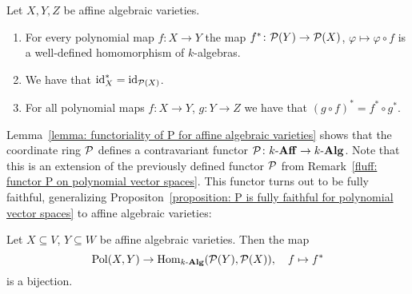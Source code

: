\begin{lemma}
  \label{lemma: functoriality of P for affine algebraic varieties}
  Let $X, Y, Z$ be affine algebraic varieties.
  \begin{enumerate}
    \item
      For every polynomial map $f \colon X \to Y$ the map $f^* \colon \mathcal{P}(Y) \to \mathcal{P}(X)$, $\varphi \mapsto \varphi \circ f$ is a well-defined homomorphism of $k$-algebras.
    \item
      We have that $\operatorname{id}_X^* = \operatorname{id}_{\mathcal{P}(X)}$.
    \item
      For all polynomial maps $f \colon X \to Y$, $g \colon Y \to Z$ we have that $(g \circ f)^* = f^* \circ g^*$.
  \end{enumerate}
\end{lemma}


\begin{remark}
  Lemma~\ref{lemma: functoriality of P for affine algebraic varieties} shows that the coordinate ring $\mathcal{P}$ defines a contravariant functor $\mathcal{P} \colon k\text{-}\mathbf{Aff} \to k\text{-}\mathbf{Alg}$.
  Note that this is an extension of the previously defined functor $\mathcal{P}$ from Remark~\ref{fluff: functor P on polynomial vector spaces}.
  This functor turns out to be fully faithful, generalizing Propositon~\ref{proposition: P is fully faithful for polynomial vector spaces} to affine algebraic varieties:
\end{remark}


\begin{proposition}
  \label{proposition: P is fully faithful for affine varieties}
  Let $X \subseteq V$, $Y \subseteq W$ be affine algebraic varieties.
  Then the map
  \[
            \operatorname{Pol}(X, Y)
    \to     \operatorname{Hom}_{k\text{-}\mathbf{Alg}}(\mathcal{P}(Y), \mathcal{P}(X)),
    \quad   f
    \mapsto f^*
  \]
  is a bijection.
\end{proposition}


